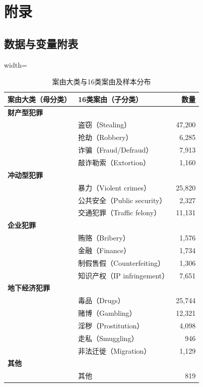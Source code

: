 \documentclass[a4paper,12pt]{report}
\renewcommand{\thefigure}{\arabic{figure}}
\renewcommand{\thetable}{\arabic{table}}
\renewcommand{\figurename}{图}
\renewcommand{\tablename}{表}
\begin{document}
\clearpage
\appendix
\chapter*{附录}

\setcounter{table}{0}
\renewcommand{\tablename}{附表}
\renewcommand{\thetable}{\arabic{table}}
\setcounter{figure}{0}
\renewcommand{\figurename}{附图}
\renewcommand{\thefigure}{\arabic{figure}}

\section{数据与变量附表}
\begin{table}[H]
\centering
\caption{案由大类与16类案由及样本分布}
\label{tab:crime_categories}
\begin{adjustbox}{width=\textwidth}
\begin{tabular}{p{3.0cm} p{8.8cm} r}
\toprule
案由大类（母分类） & 16类案由（子分类） & 数量 \\
\midrule
\multicolumn{3}{l}{\textbf{财产型犯罪}} \\
 & 盗窃（Stealing） & 47,200 \\
 & 抢劫（Robbery） & 6,285 \\
 & 诈骗（Fraud/Defraud） & 7,913 \\
 & 敲诈勒索（Extortion） & 1,160 \\
\midrule
\multicolumn{3}{l}{\textbf{冲动型犯罪}} \\
 & 暴力（Violent crimes） & 25,820 \\
 & 公共安全（Public security） & 2,327 \\
 & 交通犯罪（Traffic felony） & 11,131 \\
\midrule
\multicolumn{3}{l}{\textbf{企业犯罪}} \\
 & 贿赂（Bribery） & 1,576 \\
 & 金融（Finance） & 1,734 \\
 & 制假售假（Counterfeiting） & 1,306 \\
 & 知识产权（IP infringement） & 7,651 \\
\midrule
\multicolumn{3}{l}{\textbf{地下经济犯罪}} \\
 & 毒品（Drugs） & 25,744 \\
 & 赌博（Gambling） & 12,321 \\
 & 淫秽（Prostitution） & 4,098 \\
 & 走私（Smuggling） & 946 \\
 & 非法迁徙（Migration） & 1,129 \\
\midrule
\multicolumn{3}{l}{\textbf{其他}} \\
 & 其他 & 819 \\
\bottomrule
\end{tabular}
\end{adjustbox}
\end{table}
\end{document}
